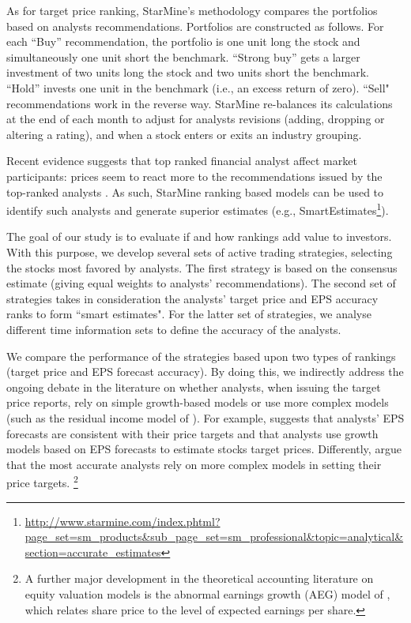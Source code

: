 \documentclass{article}\usepackage[]{graphicx}\usepackage[]{color}
\begin{document}
As for target price ranking, StarMine's methodology compares the portfolios based on analysts recommendations. Portfolios are constructed as follows. For each ``Buy'' recommendation, the portfolio is one unit long the stock and simultaneously one unit short the benchmark. ``Strong buy'' gets a larger investment of two units long the stock and two units short the benchmark. ``Hold'' invests one unit in the benchmark (i.e., an excess return of zero). ``Sell" recommendations work in the reverse way. StarMine re-balances its calculations at the end of each month to adjust for analysts revisions (adding, dropping or altering a rating), and when a stock enters or exits an industry grouping.


Recent evidence suggests that top ranked financial analyst affect market participants: prices seem to react more to the recommendations issued by the top-ranked analysts \citep{emery2009}. As such, StarMine ranking based models can be used to identify such analysts and generate superior estimates (e.g., SmartEstimates\footnote{\url{http://www.starmine.com/index.phtml?page_set=sm_products&sub_page_set=sm_professional&topic=analytical&section=accurate_estimates}}).



The goal of our study is to evaluate if and how rankings  add value to investors.  With this purpose, we develop several sets of active trading strategies, selecting the stocks most favored by analysts. The first strategy is based on the consensus estimate (giving equal weights to analysts' recommendations). The second set of strategies takes in consideration the analysts' target price and EPS accuracy ranks to form ``smart estimates". For the latter set of strategies, we analyse different time information sets to define the accuracy of the analysts.


We compare the performance of the strategies based upon two types of rankings (target price and EPS forecast accuracy). By doing this, we indirectly address the ongoing debate in the literature on whether analysts, when issuing the target price reports, rely on simple growth-based models or use more complex models (such as the residual income model of \cite{ohlson1995}). For example, \cite{bradshaw2004} suggests that analysts' EPS forecasts are consistent with their price targets and that analysts use growth models based on EPS forecasts to estimate stocks target prices. Differently, \cite{simon2011} argue that the most accurate analysts rely on more complex models in setting their price targets. \footnote{A further major development in the theoretical accounting literature on equity valuation models is the abnormal earnings growth (AEG) model of \cite{ohlson2005}, which relates share price to the level of expected earnings per share.}
\end{document}
